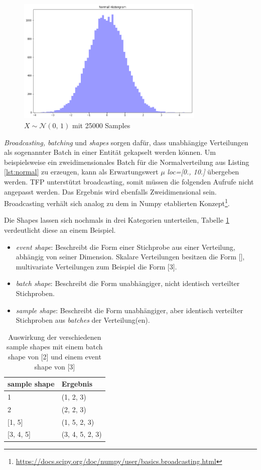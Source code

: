 \documentclass[12pt]{article}
\begin{document}
\begin{figure}[h]
    \centering
    \includegraphics[width=0.8\textwidth]{./figs/normal-dist.png}
    \caption{$X \sim \mathcal{N}(0,\, 1)$ mit 25000 Samples}
    \label{fig:normal_dist}
\end{figure}

\textit{Broadcasting, batching} und \textit{shapes} sorgen dafür, dass unabhängige Verteilungen als sogenannter Batch in einer Entität  gekapselt werden können. Um beispielsweise ein zweidimensionales Batch für die Normalverteilung aus Listing \ref{lst:normal} zu erzeugen, kann als Erwartungswert $\mu$ \textit{loc=[0., 10.]} übergeben werden. TFP unterstützt broadcasting, somit müssen die folgenden Aufrufe nicht angepasst werden. Das Ergebnis wird ebenfalls Zweidimensional sein. Broadcasting verhält sich analog zu dem in Numpy etablierten Konzept\footnote{\url{https://docs.scipy.org/doc/numpy/user/basics.broadcasting.html}}.

Die Shapes lassen sich nochmals in drei Kategorien unterteilen, Tabelle \ref{table:shapes} verdeutlicht diese an einem Beispiel.
\begin{itemize}
  \item \textit{event shape}: Beschreibt die Form einer Stichprobe aus einer Verteilung, abhängig von seiner Dimension. Skalare Verteilungen besitzen die Form [], multivariate Verteilungen zum Beispiel die Form [3].
  \item \textit{batch shape}: Beschreibt die Form unabhängiger, nicht identisch verteilter Stichproben.
  \item \textit{sample shape}: Beschreibt die Form unabhängiger, aber identisch verteilter Stichproben aus \textit{batches} der Verteilung(en).
\end{itemize}

\begin{table}[]
\centering
\begin{tabular}{|l|l|}
\hline
sample shape  & Ergebnis        \\ \hline
1             & (1, 2, 3)       \\ \hline
2             & (2, 2, 3)       \\ \hline
{[}1, 5{]}    & (1, 5, 2, 3)    \\ \hline
{[}3, 4, 5{]} & (3, 4, 5, 2, 3) \\ \hline
\end{tabular}
\caption{Auswirkung der verschiedenen sample shapes mit einem batch shape von [2] und einem event shape von [3]}
\label{table:shapes}
\end{table}
\end{document}
